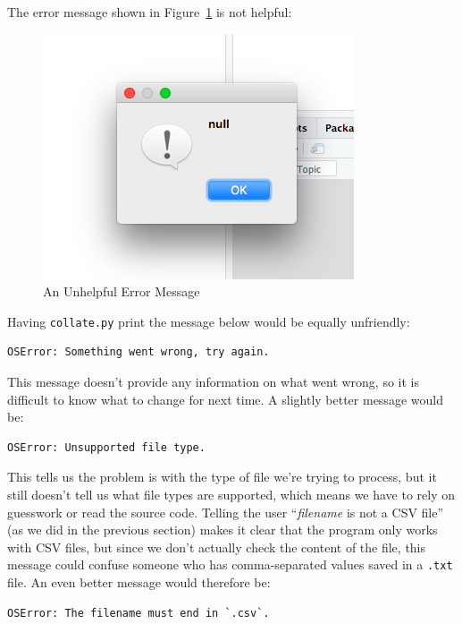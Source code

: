 \documentclass[
]{krantz}
\begin{document}
The error message shown in Figure~\ref{fig:errors-error-message} is not helpful:

\begin{figure}

{\centering \includegraphics[width=0.6\linewidth]{figures/scripting/error-message} 

}

\caption{An Unhelpful Error Message}\label{fig:errors-error-message}
\end{figure}

Having \texttt{collate.py} print the message below would be equally unfriendly:

\begin{verbatim}
OSError: Something went wrong, try again.
\end{verbatim}

This message doesn't provide any information on what went wrong,
so it is difficult to know what to change for next time.
A slightly better message would be:

\begin{verbatim}
OSError: Unsupported file type.
\end{verbatim}

This tells us the problem is with the type of file we're trying to process,
but it still doesn't tell us what file types are supported,
which means we have to rely on guesswork or read the source code.
Telling the user ``\emph{filename} is not a CSV file''
(as we did in the previous section)
makes it clear that the program only works with CSV files,
but since we don't actually check the content of the file,
this message could confuse someone who has comma-separated values saved in a \texttt{.txt} file.
An even better message would therefore be:

\begin{verbatim}
OSError: The filename must end in `.csv`.
\end{verbatim}
\end{document}
